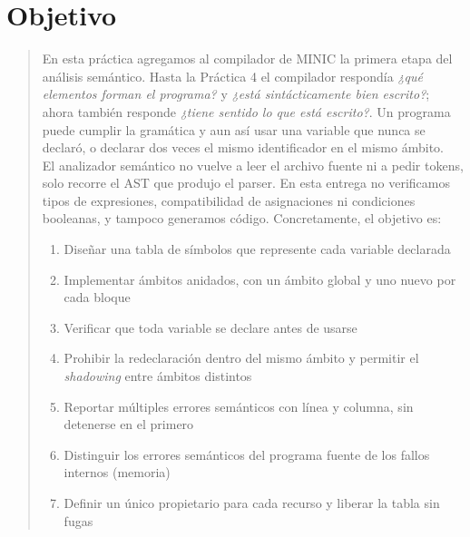 \documentclass[12pt,letterpaper]{article}
\newcommand{\minic}{
  {M\footnotesize INI\normalsize C}
}
\begin{document}
\thispagestyle{empty}


\newpage

\section*{Objetivo}

\begin{quote}
  En esta práctica agregamos al compilador de \minic{} la primera etapa del análisis semántico. Hasta la
  Práctica 4 el compilador respondía \emph{¿qué elementos forman el programa?} y \emph{¿está sintácticamente
  bien escrito?}; ahora también responde \emph{¿tiene sentido lo que está escrito?}. Un programa puede
  cumplir la gramática y aun así usar una variable que nunca se declaró, o declarar dos veces el mismo
  identificador en el mismo ámbito.\\

  El analizador semántico no vuelve a leer el archivo fuente ni a pedir tokens, solo recorre el AST que produjo
  el parser. En esta entrega no verificamos tipos de expresiones, compatibilidad de asignaciones ni condiciones
  booleanas, y tampoco generamos código. Concretamente, el objetivo es:

  \begin{enumerate}[label=\arabic*.]
  \item Diseñar una tabla de símbolos que represente cada variable declarada
  \item Implementar ámbitos anidados, con un ámbito global y uno nuevo por cada bloque
  \item Verificar que toda variable se declare antes de usarse
  \item Prohibir la redeclaración dentro del mismo ámbito y permitir el \emph{shadowing} entre ámbitos distintos
  \item Reportar múltiples errores semánticos con línea y columna, sin detenerse en el primero
  \item Distinguir los errores semánticos del programa fuente de los fallos internos (memoria)
  \item Definir un único propietario para cada recurso y liberar la tabla sin fugas
  \end{enumerate}
\end{quote}
\end{document}
